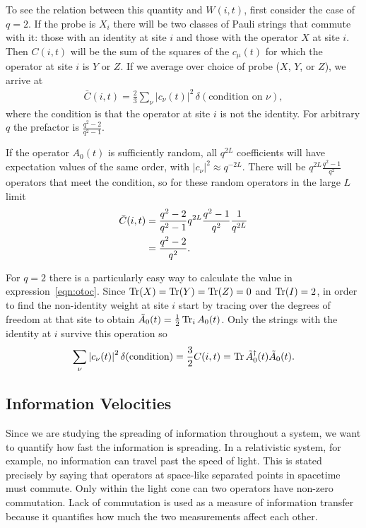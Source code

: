 To see the relation between this quantity and $W(i,t)$, first consider the case of $q=2$. If the probe is $X_i$ there will be two classes of Pauli strings that commute with it: those with an identity at site $i$ and those with the operator $X$ at site $i$. Then $C(i,t)$ will be the sum of the squares of the $c_\mu(t)$ for which the operator at site $i$ is $Y$ or $Z$. If we average over choice of probe ($X$, $Y$, or $Z$), we arrive at 
\begin{align}
\bar{C}(i,t) = \frac{2}{3}\sum_\nu|c_\nu(t)|^2\,\delta(\text{condition 
	on $\nu$}),\label{eqn:otoc}
\end{align}
where the condition is that the operator at site $i$ is not the identity. For arbitrary $q$ the prefactor is $\frac{q^2-2}{q^2-1}$. 

If the operator $A_0(t)$ is sufficiently random, all $q^{2L}$ coefficients will have expectation values of the same order, with $|c_\nu|^2 \approx q^{-2L}$. There will be $q^{2L}\frac{q^2-1}{q^2}$ operators that meet the condition, so for these random operators in the large $L$ limit
\begin{align}
\bar{C}(i,t) &= \frac{q^2-2}{q^2-1}q^{2L}\frac{q^2-1}{q^2}\frac{1}{q^{2L}}\nonumber\\
&= \frac{q^2-2}{q^2}\nonumber.
\end{align}

For $q=2$ there is a particularly easy way to calculate the value in expression~\ref{eqn:otoc}. Since $\operatorname{Tr}(X) = \operatorname{Tr}(Y)=\operatorname{Tr}(Z) = 0$ and $\operatorname{Tr}(I) = 2$, in order to find the non-identity weight at site $i$ start by tracing over the degrees of freedom at that site to obtain $\tilde{A}_0(t) = \frac{1}{2}\operatorname{Tr}_iA_0(t)$. Only the strings with the identity at $i$ survive this operation so
\begin{align}
\sum_\nu \left|c_\nu(t)\right|^2\delta(\text{condition}) = \frac{3}{2}C(i,t) =  \operatorname{Tr} 
	\tilde{A}^\dag_0(t)\tilde{A}_0(t).
\end{align}

\subsection{Information Velocities} \label{sub:vels}

Since we are studying the spreading of information throughout a system, we want to quantify how fast the information is spreading. In a relativistic system, for example, no information can travel past the speed of light. This is stated precisely by saying that operators at space-like separated points in spacetime must commute. Only within the light cone can two operators have non-zero commutation. Lack of commutation is used as a measure of information transfer because it quantifies how much the two measurements affect each other.

